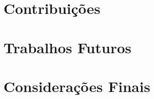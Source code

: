 




\section{Contribuições}
\label{sec:contributions}

\section{Trabalhos Futuros}
\label{sec:future-work}






% 

\section{Considerações Finais}
\label{sec:final-considerations}
